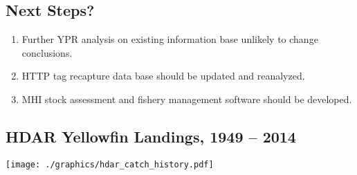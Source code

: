 \documentclass[a4paper,KOMA,landscape,titlepage]{powersem}
\begin{document}
\begin{slide}\section{Next Steps?}
\begin{enumerate}
\item Further YPR analysis on existing information base unlikely to
change conclusions.

\item HTTP tag recapture data base should be updated and reanalyzed.

\item MHI stock assessment and fishery management software should be
developed.
\end{enumerate}
\end{slide}


\begin{slide}\section{HDAR Yellowfin Landings, 1949 -- 2014}
\begin{center}
\texttt{[image: ./graphics/hdar\_catch\_history.pdf]}
\end{center}
\end{slide}
\end{document}

